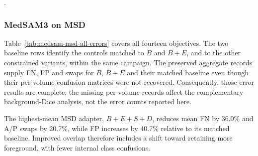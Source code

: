 \noindent{}.

\subsubsection{MedSAM3 on MSD}

Table~\ref{tab:medsam-msd-all-errors} covers all fourteen objectives.
The two baseline rows identify the controls matched to $B$ and $B+E$,
and to the other constrained variants, within the same campaign.
The preserved aggregate records supply FN, FP and swaps for $B$, $B+E$
and their matched baseline even though their per-volume confusion
matrices were not recovered. Consequently, those error results are
complete; the missing per-volume records affect the complementary
background-Dice analysis, not the error counts reported here.

The highest-mean MSD adapter, $B+E+S+D$, reduces mean FN by 36.0\%
and A/P swaps by 20.7\%, while FP increases by 40.7\% relative to its
matched baseline. Improved overlap therefore includes a shift toward
retaining more foreground, with fewer internal class confusions.

